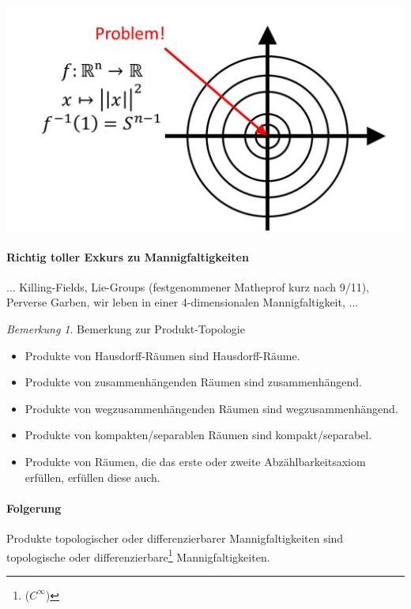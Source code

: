 \documentclass[a4paper,11pt,notitlepage]{report}
\theoremstyle{remark}
\newtheorem{remark}{Bemerkung}[chapter]
\theoremstyle{definition}
\begin{document}
\includegraphics[scale=0.4]{images/Norm_invers.jpg}


\paragraph{Richtig toller Exkurs zu Mannigfaltigkeiten}... Killing-Fields, Lie-Groups (festgenommener Matheprof kurz nach 9/11), Perverse Garben, wir leben in einer 4-dimensionalen Mannigfaltigkeit, ...

\newpage
\begin{remark}{Bemerkung zur Produkt-Topologie}
\begin{itemize}
	\item Produkte von Hausdorff-Räumen sind Hausdorff-Räume.
	\item Produkte von zusammenhängenden Räumen sind zusammenhängend.
	\item Produkte von wegzusammenhängenden Räumen sind wegzusammenhängend.
	\item Produkte von kompakten/separablen Räumen sind kompakt/separabel.
	\item Produkte von Räumen, die das erste oder zweite Abzählbarkeitsaxiom erfüllen, erfüllen diese auch.
\end{itemize}
 
\paragraph{Folgerung}
	Produkte topologischer oder differenzierbarer Mannigfaltigkeiten sind topologische oder differenzierbare\footnote{($C^\infty$)} Mannigfaltigkeiten.
\end{remark}
 
\end{document}
